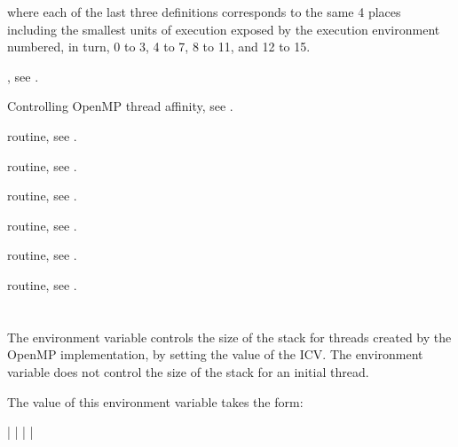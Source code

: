 where each of the last three definitions corresponds to the same 4 places
including the smallest units of execution exposed by the execution environment
numbered, in turn, 0 to 3, 4 to 7, 8 to 11, and 12 to 15.

\begin{crossrefs}
\item {}, see .

\item Controlling OpenMP thread affinity,
see .

\item {} routine, see .

\item {} routine,
see .

\item {} routine,
see .

\item {} routine, see .

\item {} routine,
see .

\item {} routine,
see .
\end{crossrefs}



\section{}
\label{sec:OMP_STACKSIZE}
The  environment variable controls the size of the
stack for threads created by the OpenMP implementation, by setting the
value of the  ICV. The environment variable does not
control the size of the stack for an initial thread.

The value of this environment variable takes the form:

 |  |  |  | 

